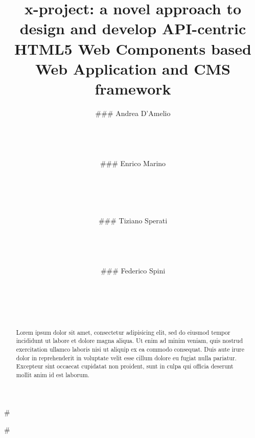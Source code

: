 \documentclass{sig-alternate}
\begin{document}
# \title{x-project: a novel approach to design and develop API-centric HTML5 Web Components based Web Application and CMS framework}

\author{
\alignauthor
### Andrea D'Amelio\\
  \\
  \\
  \\
  \\
\alignauthor
### Enrico Marino\\
  \\
  \\
  \\
  \\
\and
\alignauthor
### Tiziano Sperati\\
  \\
  \\
  \\
  \\
\alignauthor
### Federico Spini\\
  \\
  \\
  \\
  \\
}

\maketitle
# \begin{abstract}
Lorem ipsum dolor sit amet, consectetur adipisicing elit, sed do eiusmod
tempor incididunt ut labore et dolore magna aliqua. Ut enim ad minim veniam,
quis nostrud exercitation ullamco laboris nisi ut aliquip ex ea commodo
consequat. Duis aute irure dolor in reprehenderit in voluptate velit esse
cillum dolore eu fugiat nulla pariatur. Excepteur sint occaecat cupidatat non
proident, sunt in culpa qui officia deserunt mollit anim id est laborum.
\end{abstract}
\end{document}
